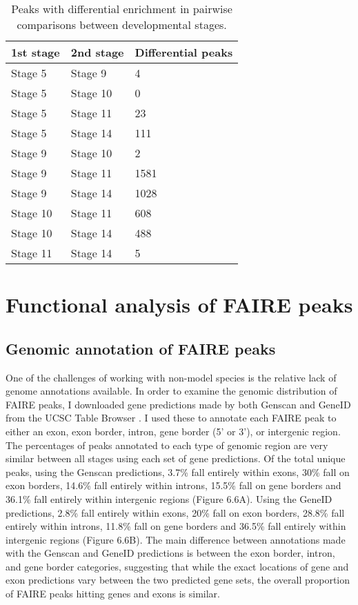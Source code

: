 \begin{table}[h]
\centering
\begin{tabular}{|l|l|l|}
\hline
\textbf{1st stage} & \textbf{2nd stage} & \textbf{Differential peaks} \\ \hline
Stage 5   & Stage 9   & 4                  \\ \hline
Stage 5   & Stage 10  & 0                  \\ \hline
Stage 5   & Stage 11  & 23                 \\ \hline
Stage 5   & Stage 14  & 111                \\ \hline
Stage 9   & Stage 10  & 2                  \\ \hline
Stage 9   & Stage 11  & 1581               \\ \hline
Stage 9   & Stage 14  & 1028               \\ \hline
Stage 10  & Stage 11  & 608                \\ \hline
Stage 10  & Stage 14  & 488                \\ \hline
Stage 11  & Stage 14  & 5                  \\ \hline
\end{tabular}
\caption{Peaks with differential enrichment in pairwise comparisons between developmental stages.}
\label{Table 6.3}
\end{table}

\section{Functional analysis of FAIRE peaks}
\subsection{Genomic annotation of FAIRE peaks}
One of the challenges of working with non-model species is the relative lack of genome annotations available. In order to examine the genomic distribution of FAIRE peaks, I downloaded gene predictions made by both Genscan and GeneID from the UCSC Table Browser \citep{burge_prediction_1997,karolchik_ucsc_2004, karolchik_ucsc_2014,parra_geneid_2000}. I used these to annotate each FAIRE peak to either an exon, exon border, intron, gene border (5' or 3'), or intergenic region. The percentages of peaks annotated to each type of genomic region are very similar between all stages using each set of gene predictions. Of the total unique peaks, using the Genscan predictions, 3.7\% fall entirely within exons, 30\% fall on exon borders, 14.6\% fall entirely within introns, 15.5\% fall on gene borders and 36.1\% fall entirely within intergenic regions (Figure 6.6A). Using the GeneID predictions, 2.8\% fall entirely within exons, 20\% fall on exon borders, 28.8\% fall entirely within introns, 11.8\% fall on gene borders and 36.5\% fall entirely within intergenic regions (Figure 6.6B). The main difference between annotations made with the Genscan and GeneID predictions is between the exon border, intron, and gene border categories, suggesting that while the exact locations of gene and exon predictions vary between the two predicted gene sets, the overall proportion of FAIRE peaks hitting genes and exons is similar.

